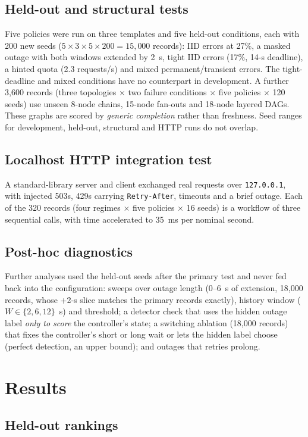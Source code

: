 \documentclass[conference,a4paper]{IEEEtran}
\begin{document}
\subsection{Held-out and structural tests}
Five policies were run on three templates and five held-out conditions, each with 200 new seeds ($5\times3\times5\times200=15{,}000$ records): IID errors at 27\%, a masked outage with both windows extended by 2~s, tight IID errors (17\%, 14-s deadline), a hinted quota (2.3 requests/s) and mixed permanent/transient errors. The tight-deadline and mixed conditions have no counterpart in development. A further 3,600 records (three topologies $\times$ two failure conditions $\times$ five policies $\times$ 120 seeds) use unseen 8-node chains, 15-node fan-outs and 18-node layered DAGs. These graphs are scored by \emph{generic completion} rather than freshness. Seed ranges for development, held-out, structural and HTTP runs do not overlap.

\subsection{Localhost HTTP integration test}
A standard-library server and client exchanged real requests over \texttt{127.0.0.1}, with injected 503s, 429s carrying \texttt{Retry-After}, timeouts and a brief outage. Each of the 320 records (four regimes $\times$ five policies $\times$ 16 seeds) is a workflow of three sequential calls, with time accelerated to 35~ms per nominal second.

\subsection{Post-hoc diagnostics}
Further analyses used the held-out seeds after the primary test and never fed back into the configuration: sweeps over outage length (0--6~s of extension, 18,000 records, whose +2-s slice matches the primary records exactly), history window ($W\in\{2,6,12\}$~s) and threshold; a detector check that uses the hidden outage label \emph{only to score} the controller's state; a switching ablation (18,000 records) that fixes the controller's short or long wait or lets the hidden label choose (perfect detection, an upper bound); and outages that retries prolong.

\section{Results}
\subsection{Held-out rankings}\label{sec:heldout}

\end{document}
